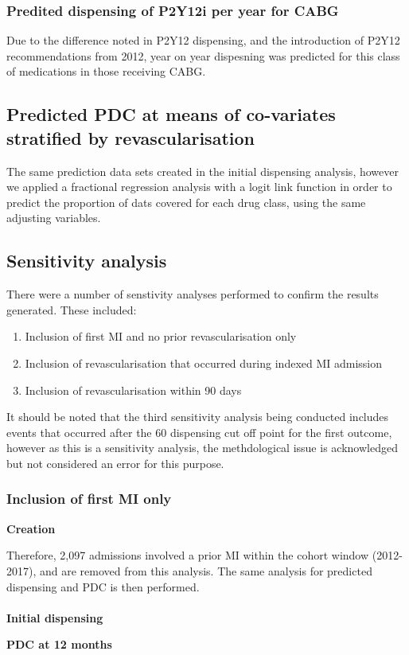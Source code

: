\documentclass[11pt]{article}
\begin{document}
\subsubsection{Predited dispensing of P2Y12i per year for CABG}
Due to the difference noted in P2Y12 dispensing, and the introduction of P2Y12 recommendations from 2012, year on year dispesning was predicted for this class of medications in those receiving CABG. 
\color{violet}
\begin{stlog}\end{stlog}
\color{black}
\pagebreak
\subsection{Predicted PDC at means of co-variates stratified by revascularisation}
The same prediction data sets created in the initial dispensing analysis, however we applied a fractional regression analysis with a logit link function in order to predict the proportion of dats covered for each drug class, using the same adjusting variables. 
\color{violet}
\begin{stlog}\end{stlog}
\color{black}
\pagrebreak
\subsection{Sensitivity analysis}
There were a number of senstivity analyses performed to confirm the results generated. These included: 
\begin{enumerate}
\item Inclusion of first MI and no prior revascularisation only
\item Inclusion of revascularisation that occurred during indexed MI admission
\item Inclusion of revascularisation within 90 days
\end{enumerate}
It should be noted that the third sensitivity analysis being conducted includes events that occurred after the 60 dispensing cut off point for the first outcome, however as this is a sensitivity analysis, the methdological issue is acknowledged but not considered an error for this purpose. 
\subsubsection{Inclusion of first MI only}
\textbf{Creation}
\color{violet}
\begin{stlog}\end{stlog}
\color{black}
Therefore, 2,097 admissions involved a prior MI within the cohort window (2012-2017), and are removed from this analysis. The same analysis for predicted dispensing and PDC is then performed. \\~\\
\textbf{Initial dispensing}
\color{violet}
\begin{stlog}\end{stlog}
\color{black}
\textbf{PDC at 12 months}
\color{violet}
\begin{stlog}\end{stlog}
\color{black}
\end{document}
